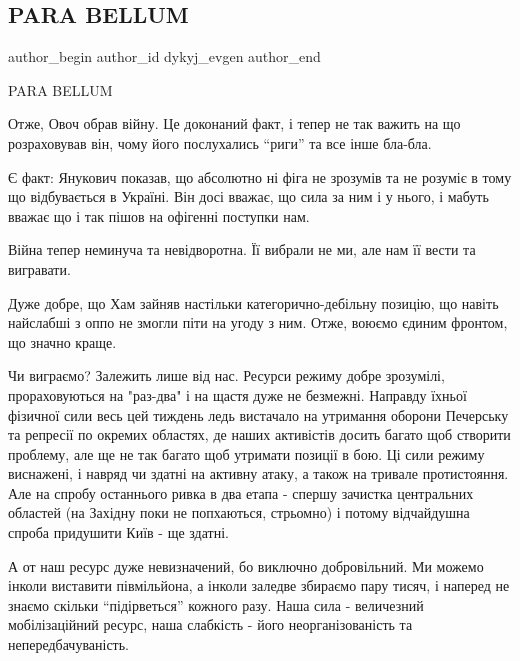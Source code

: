  
 
 
 
 
 
\subsection{PARA BELLUM}
\label{sec:30_01_2014.fb.dykyj_evgen.1.para_bellum}
 
\ifcmt
 author_begin
   author_id dykyj_evgen
 author_end
\fi

PARA BELLUM

Отже, Овоч обрав війну. Це доконаний факт, і тепер не так важить на що
розраховував він, чому його послухались \enquote{риги} та все інше бла-бла.

Є факт: Янукович показав, що абсолютно ні фіга не зрозумів та не розуміє в тому
що відбувається в Україні. Він досі вважає, що сила за ним і у нього, і мабуть
вважає що і так пішов на офігенні поступки нам.

Війна тепер неминуча та невідворотна. Її вибрали не ми, але нам її вести та
вигравати.

Дуже добре, що Хам зайняв настільки категорично-дебільну позицію, що навіть
найслабші з оппо не змогли піти на угоду з ним. Отже, воюємо єдиним фронтом, що
значно краще.

Чи виграємо? Залежить лише від нас. Ресурси режиму добре зрозумілі,
прораховуються на "раз-два" і на щастя дуже не безмежні. Направду їхньої
фізичної сили весь цей тиждень ледь вистачало на утримання оборони Печерську та
репресії по окремих областях, де наших активістів досить багато щоб створити
проблему, але ще не так багато щоб утримати позиції в бою. Ці сили режиму
виснажені, і навряд чи здатні на активну атаку, а також на тривале
протистояння. Але на спробу останнього ривка в два етапа - спершу зачистка
центральних областей (на Західну поки не попхаються, стрьомно) і потому
відчайдушна спроба придушити Київ - ще здатні.

А от наш ресурс дуже невизначений, бо виключно добровільний. Ми можемо інколи
виставити півмільйона, а інколи заледве збираємо пару тисяч, і наперед не
знаємо скільки \enquote{підірветься} кожного разу. Наша сила - величезний
мобілізаційний ресурс, наша слабкість - його неорганізованість та
непередбачуваність.

